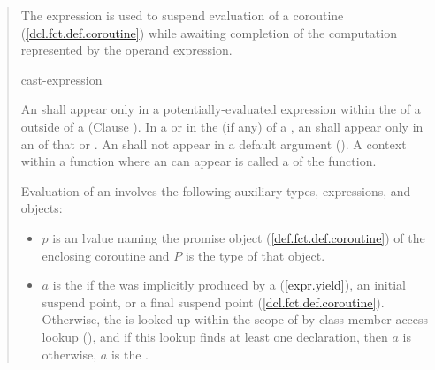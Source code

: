 \begin{quote}
\pnum
The  expression is used to suspend evaluation of a 
coroutine (\ref{dcl.fct.def.coroutine}) while awaiting completion of the computation represented by the operand expression.

\begin{bnf}
  \br
   cast-expression
\end{bnf}

\pnum
An  shall appear only in a potentially-evaluated expression within the  of a  
 outside of a  (Clause ). In a  or in the  (if any) of a , an  shall appear only in an  of that  or .
An  shall not appear in a default argument (). A context within a function where an  can appear is called a  of the function.

\pnum
Evaluation of an  involves the following auxiliary types, expressions, and objects:

\begin{itemize}
	
  
  \item $p$ is an lvalue naming the promise object (\ref{def.fct.def.coroutine}) of the enclosing coroutine and $P$ is the type of that object.
  
  \item $a$ is the  if 
  the  was implicitly produced by a  (\ref{expr.yield}), an initial suspend point, or a final suspend point (\ref{dcl.fct.def.coroutine}). 
  Otherwise, the   is looked up within the scope of  by class member access lookup (), and if this lookup finds at least one declaration, then $a$ is \linebreak\mbox{} otherwise, $a$ is the  .
  

\end{itemize}
\end{quote}
